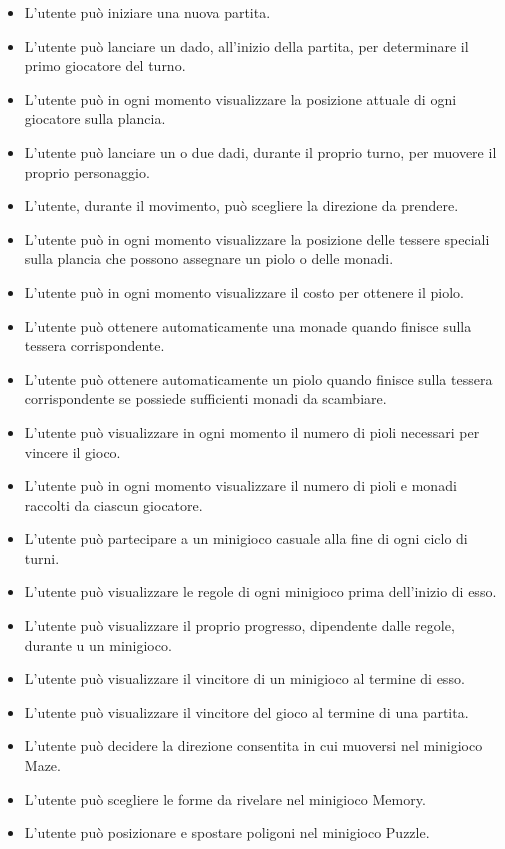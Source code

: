 \begin{itemize}
      \item L'utente può iniziare una nuova partita.
      \item L'utente può lanciare un dado, all'inizio della partita, per determinare il 
            primo giocatore del turno.
      \item L'utente può in ogni momento visualizzare la posizione attuale di ogni giocatore
            sulla plancia.
      \item L'utente può lanciare un o due dadi, durante il proprio turno, per muovere il proprio
            personaggio.
      \item L'utente, durante il movimento, può scegliere la direzione da prendere.
      \item L'utente può in ogni momento visualizzare la posizione delle tessere speciali sulla
            plancia che possono assegnare un piolo o delle monadi.
      \item L'utente può in ogni momento visualizzare il costo per ottenere il piolo.
      \item L'utente può ottenere automaticamente una monade quando finisce sulla tessera 
            corrispondente.
      \item L'utente può ottenere automaticamente un piolo quando finisce sulla tessera 
            corrispondente se possiede sufficienti monadi da scambiare.
      \item L'utente può visualizzare in ogni momento il numero di pioli necessari per vincere 
            il gioco.
      \item L'utente può in ogni momento visualizzare il numero di pioli e monadi raccolti 
            da ciascun giocatore.
      \item L'utente può partecipare a un minigioco casuale alla fine di ogni ciclo di turni.
      \item L'utente può visualizzare le regole di ogni minigioco prima dell'inizio di esso.
      \item L'utente può visualizzare il proprio progresso, dipendente dalle regole, durante u
            un minigioco.
      \item L'utente può visualizzare il vincitore di un minigioco al termine di esso.
      \item L'utente può visualizzare il vincitore del gioco al termine di una partita.
      \item L'utente può decidere la direzione consentita in cui muoversi nel minigioco Maze.
      \item L'utente può scegliere le forme da rivelare nel minigioco Memory.
      \item L'utente può posizionare e spostare poligoni nel minigioco Puzzle.
\end{itemize}

